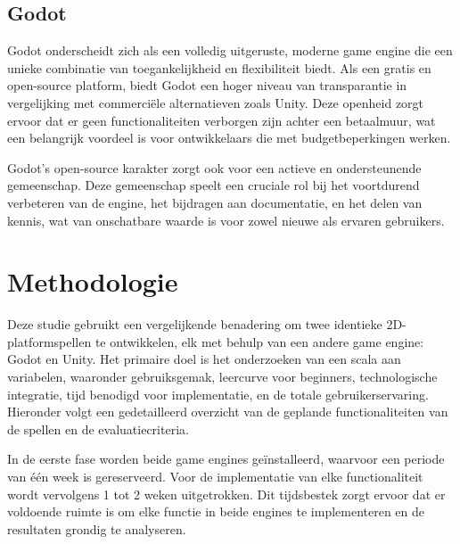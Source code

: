 \subsection{Godot}
Godot onderscheidt zich als een volledig uitgeruste, moderne game engine die een unieke combinatie van toegankelijkheid en flexibiliteit biedt. Als een gratis en open-source platform, biedt Godot een hoger niveau van transparantie in vergelijking met commerciële alternatieven zoals Unity. Deze openheid zorgt ervoor dat er geen functionaliteiten verborgen zijn achter een betaalmuur, wat een belangrijk voordeel is voor ontwikkelaars die met budgetbeperkingen werken.\autocite{Bradfield2018}

Godot's open-source karakter zorgt ook voor een actieve en ondersteunende gemeenschap. Deze gemeenschap speelt een cruciale rol bij het voortdurend verbeteren van de engine, het bijdragen aan documentatie, en het delen van kennis, wat van onschatbare waarde is voor zowel nieuwe als ervaren gebruikers.


\section{Methodologie}
\label{sec:methodologie}

Deze studie gebruikt een vergelijkende benadering om twee identieke 2D-platformspellen te ontwikkelen, elk met behulp van een andere game engine: Godot en Unity. Het primaire doel is het onderzoeken van een scala aan variabelen, waaronder gebruiksgemak, leercurve voor beginners, technologische integratie, tijd benodigd voor implementatie, en de totale gebruikerservaring. Hieronder volgt een gedetailleerd overzicht van de geplande functionaliteiten van de spellen en de evaluatiecriteria.

In de eerste fase worden beide game engines geïnstalleerd, waarvoor een periode van één week is gereserveerd. Voor de implementatie van elke functionaliteit wordt vervolgens 1 tot 2 weken uitgetrokken. Dit tijdsbestek zorgt ervoor dat er voldoende ruimte is om elke functie in beide engines te implementeren en de resultaten grondig te analyseren.

